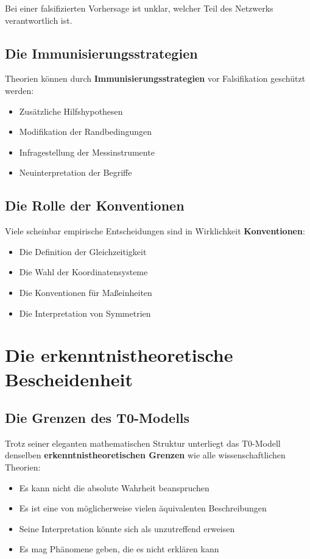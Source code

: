 \documentclass[12pt,a4paper]{report}
\begin{document}
	Bei einer falsifizierten Vorhersage ist unklar, welcher Teil des Netzwerks verantwortlich ist.
	
	\subsection{Die Immunisierungsstrategien}
	
	Theorien können durch \textbf{Immunisierungsstrategien} vor Falsifikation geschützt werden:
	
	\begin{itemize}
		\item Zusätzliche Hilfshypothesen
		\item Modifikation der Randbedingungen
		\item Infragestellung der Messinstrumente
		\item Neuinterpretation der Begriffe
	\end{itemize}
	
	\subsection{Die Rolle der Konventionen}
	
	Viele scheinbar empirische Entscheidungen sind in Wirklichkeit \textbf{Konventionen}:
	
	\begin{itemize}
		\item Die Definition der Gleichzeitigkeit
		\item Die Wahl der Koordinatensysteme
		\item Die Konventionen für Maßeinheiten
		\item Die Interpretation von Symmetrien
	\end{itemize}
	
	\section{Die erkenntnistheoretische Bescheidenheit}
	
	\subsection{Die Grenzen des T0-Modells}
	
	Trotz seiner eleganten mathematischen Struktur unterliegt das T0-Modell denselben \textbf{erkenntnistheoretischen Grenzen} wie alle wissenschaftlichen Theorien:
	
	\begin{itemize}
		\item Es kann nicht die absolute Wahrheit beanspruchen
		\item Es ist eine von möglicherweise vielen äquivalenten Beschreibungen
		\item Seine Interpretation könnte sich als unzutreffend erweisen
		\item Es mag Phänomene geben, die es nicht erklären kann
	\end{itemize}
	
\end{document}
